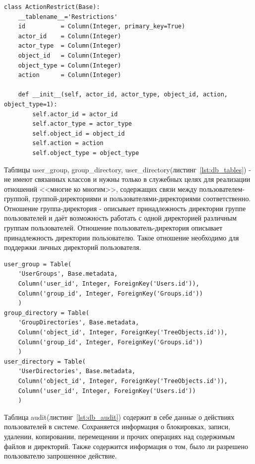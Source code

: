 \documentclass[utf8,usehyperref,12pt]{G7-32}
\begin{document}
\lstset{language=Python,caption=Права доступа,label=lst:db_action_restrict}
\begin{lstlisting}  
class ActionRestrict(Base):
    __tablename__='Restrictions'
    id          = Column(Integer, primary_key=True)
    actor_id    = Column(Integer)
    actor_type  = Column(Integer)    
    object_id   = Column(Integer)
    object_type = Column(Integer)
    action      = Column(Integer)    

    def __init__(self, actor_id, actor_type, object_id, action, object_type=1):
        self.actor_id = actor_id
        self.actor_type = actor_type
        self.object_id = object_id
        self.action = action
        self.object_type = object_type       
\end{lstlisting}

Таблицы user\_group, group\_directory, user\_directory(листинг~\ref{lst:db_tables}) - не имеют связанных классов и нужны только в служебных целях для реализации отношений <<многие ко многим>>, содержащих связи между пользователем-группой, группой-директориями и пользователями-директориями соответственно. 
Отношение группа-директория - описывает принадлежность директории группе пользователей и даёт возможность работать с одной директорией различным группам пользователей. 
Отношение пользователь-директория описывает принадлежность директории пользователю. Такое отношение необходимо для поддержки личных директорий пользователя.

\lstset{language=Python,caption=Вспомогательные таблицы,label=lst:db_tables}
\begin{lstlisting}  
user_group = Table(
    'UserGroups', Base.metadata,    
    Column('user_id', Integer, ForeignKey('Users.id')),
    Column('group_id', Integer, ForeignKey('Groups.id'))
    )
group_directory = Table(
    'GroupDirectories', Base.metadata,    
    Column('object_id', Integer, ForeignKey('TreeObjects.id')),
    Column('group_id', Integer, ForeignKey('Groups.id'))
    )
user_directory = Table(
    'UserDirectories', Base.metadata,    
    Column('object_id', Integer, ForeignKey('TreeObjects.id')),
    Column('user_id', Integer, ForeignKey('Users.id'))
    )
\end{lstlisting}

Таблица audit(листинг~\ref{lst:db_audit}) содержит в себе данные о действиях пользователей в системе. Сохраняется информация о блокировках, записи, удалении, копировании, перемещении и прочих операциях над содержимым файлов и директорий. Также содержится информация о том, было ли разрешено пользователю запрошенное действие.
\end{document}
